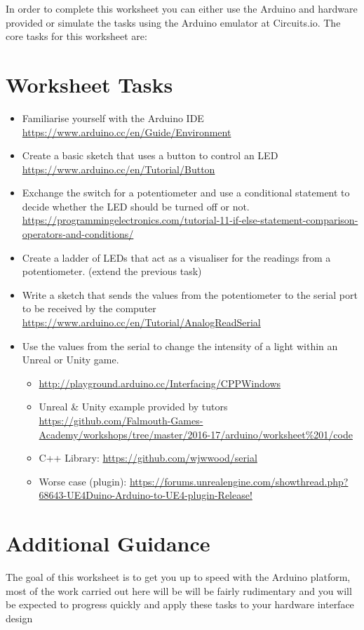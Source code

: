 \documentclass{../../../fal_assignment}
\begin{document}
In order to complete this worksheet you can either use the Arduino and hardware provided or simulate the tasks using the Arduino emulator at Circuits.io. The core tasks for this worksheet are:

\section*{Worksheet Tasks}
\begin{itemize}
	\item Familiarise yourself with the Arduino IDE \url{https://www.arduino.cc/en/Guide/Environment}
	\item Create a basic sketch that uses a button to control an LED \url{https://www.arduino.cc/en/Tutorial/Button}
	\item Exchange the switch for a potentiometer and use a conditional statement to decide whether the LED should be turned off or not. \url{https://programmingelectronics.com/tutorial-11-if-else-statement-comparison-operators-and-conditions/}
	\item Create a ladder of LEDs that act as a visualiser for the readings from a potentiometer. (extend the previous task)
	\item Write a sketch that sends the values from the potentiometer to the serial port to be received by the computer \url{https://www.arduino.cc/en/Tutorial/AnalogReadSerial}
	\item Use the values from the serial to change the intensity of a light within an Unreal or Unity game. 
		\begin{itemize}
			\item \url{http://playground.arduino.cc/Interfacing/CPPWindows} 
			\item Unreal \& Unity example provided by tutors \url{https://github.com/Falmouth-Games-Academy/workshops/tree/master/2016-17/arduino/worksheet%201/code}
			\item C++ Library: \url{https://github.com/wjwwood/serial}
			\item Worse case (plugin): \url{https://forums.unrealengine.com/showthread.php?68643-UE4Duino-Arduino-to-UE4-plugin-Release!}
		\end{itemize}
\end{itemize}


\section*{Additional Guidance}

The goal of this worksheet is to get you up to speed with the Arduino platform, most of the work carried out here will be will be fairly rudimentary and you will be expected to progress quickly and apply these tasks to your hardware interface design
\end{document}

